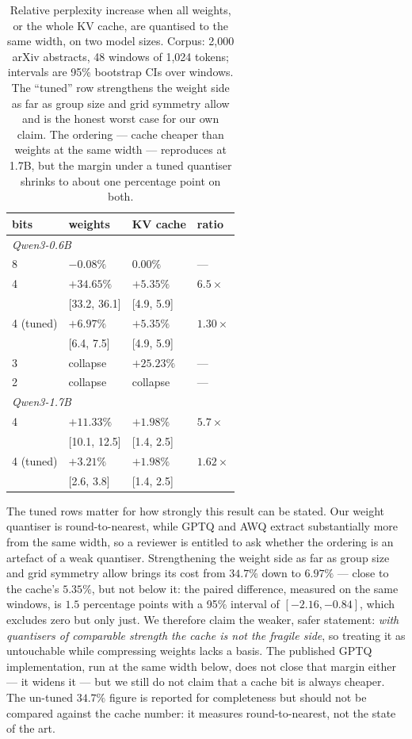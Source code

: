 \documentclass[5p]{elsarticle}
\begin{document}
\begin{table}[t]
\centering
\caption{Relative perplexity increase when all weights, or the whole KV cache,
are quantised to the same width, on two model sizes. Corpus: 2{,}000 arXiv
abstracts, 48 windows of 1{,}024 tokens; intervals are 95\% bootstrap CIs over
windows. The ``tuned'' row strengthens the weight side as far as group size and
grid symmetry allow and is the honest worst case for our own claim. The
ordering --- cache cheaper than weights at the same width --- reproduces at
1.7B, but the margin under a tuned quantiser shrinks to about one percentage
point on both.}
\label{tab:bitcost}
\begin{tabular}{llll}
\toprule
bits & weights & KV cache & ratio \\
\midrule
\multicolumn{4}{l}{\emph{Qwen3-0.6B}}\\
8 & $-0.08\%$ & $0.00\%$ & --- \\
4 & $+34.65\%$ & $+5.35\%$ & $6.5\times$ \\
  & {\small[33.2, 36.1]} & {\small[4.9, 5.9]} & \\
4 (tuned) & $+6.97\%$ & $+5.35\%$ & $1.30\times$ \\
  & {\small[6.4, 7.5]} & {\small[4.9, 5.9]} & \\
3 & collapse & $+25.23\%$ & --- \\
2 & collapse & collapse & --- \\
\midrule
\multicolumn{4}{l}{\emph{Qwen3-1.7B}}\\
4 & $+11.33\%$ & $+1.98\%$ & $5.7\times$ \\
  & {\small[10.1, 12.5]} & {\small[1.4, 2.5]} & \\
4 (tuned) & $+3.21\%$ & $+1.98\%$ & $1.62\times$ \\
  & {\small[2.6, 3.8]} & {\small[1.4, 2.5]} & \\
\bottomrule
\end{tabular}
\end{table}

The tuned rows matter for how strongly this result can be stated. Our weight
quantiser is round-to-nearest, while GPTQ and AWQ extract substantially more from
the same width, so a reviewer is entitled to ask whether the ordering is an
artefact of a weak quantiser. Strengthening the weight side as far as group size
and grid symmetry allow brings its cost from $34.7\%$ down to $6.97\%$ --- close
to the cache's $5.35\%$, but not below it: the paired difference, measured on the
same windows, is $1.5$ percentage points with a 95\% interval of
$[-2.16, -0.84]$, which excludes zero but only just. We therefore claim the
weaker, safer statement: \emph{with quantisers of comparable strength the cache
is not the fragile side}, so treating it as untouchable while compressing weights
lacks a basis. The published GPTQ implementation, run at the same width
below, does not close that margin either --- it widens it --- but we still do not
claim that a cache bit is always cheaper. The
un-tuned $34.7\%$ figure is reported for completeness but should not be compared
against the cache number: it measures round-to-nearest, not the state of the art.
\end{document}
